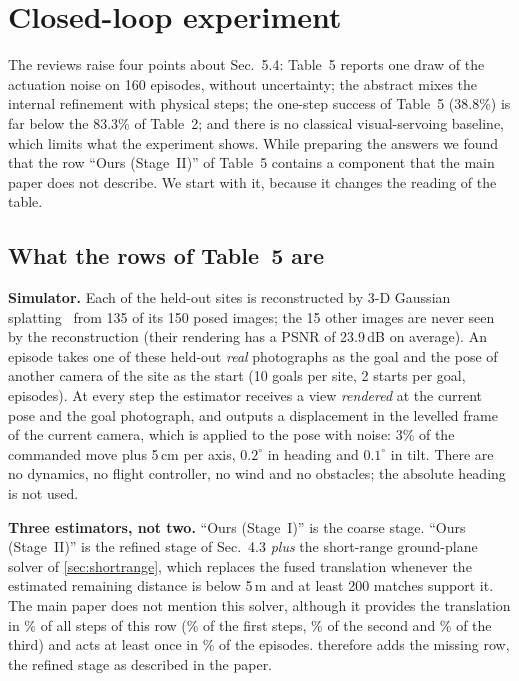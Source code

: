 \section{Closed-loop experiment}
\label{sec:closedloop}

The reviews raise four points about Sec.~5.4: Table~5 reports one draw of the actuation noise on 160 episodes, without uncertainty; the abstract mixes the internal refinement with physical steps; the one-step success of Table~5 (38.8\%) is far below the 83.3\% of Table~2; and there is no classical visual-servoing baseline, which limits what the experiment shows. While preparing the answers we found that the row ``Ours (Stage~II)'' of Table~5 contains a component that the main paper does not describe. We start with it, because it changes the reading of the table.

\subsection{What the rows of Table~5 are}
\label{sec:tablefive}

\noindent\textbf{Simulator.} Each of the \clSites{} held-out sites is reconstructed by 3-D Gaussian splatting~\cite{kerbl20233d,ye2025gsplat} from 135 of its 150 posed images; the 15 other images are never seen by the reconstruction (their rendering has a PSNR of 23.9\,dB on average). An episode takes one of these held-out \emph{real} photographs as the goal and the pose of another camera of the site as the start (10 goals per site, 2 starts per goal, \clEpisodes{} episodes). At every step the estimator receives a view \emph{rendered} at the current pose and the goal photograph, and outputs a displacement in the levelled frame of the current camera, which is applied to the pose with noise: 3\% of the commanded move plus 5\,cm per axis, $0.2^\circ$ in heading and $0.1^\circ$ in tilt. There are no dynamics, no flight controller, no wind and no obstacles; the absolute heading is not used.

\noindent\textbf{Three estimators, not two.} ``Ours (Stage~I)'' is the coarse stage. ``Ours (Stage~II)'' is the refined stage of Sec.~4.3 \emph{plus} the short-range ground-plane solver of \cref{sec:shortrange}, which replaces the fused translation whenever the estimated remaining distance is below 5\,m and at least 200 matches support it. The main paper does not mention this solver, although it provides the translation in \clPlaneSteps\% of all steps of this row (\clPlaneFirst\% of the first steps, \clPlaneSecond\% of the second and \clPlaneThird\% of the third) and acts at least once in \clPlaneFlights\% of the episodes.  therefore adds the missing row, the refined stage as described in the paper.

